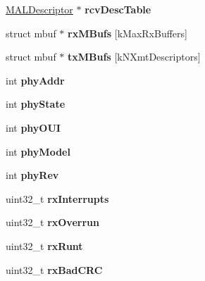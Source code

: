 \begin{DoxyCompactItemize}
\mbox{\hyperlink{structMALDescriptor}{M\+A\+L\+Descriptor}} $\ast$ {\bfseries rcv\+Desc\+Table}
\item 
\mbox{\label{structEMACLocals_aba69f1a5ef847157fe91777cfa6d0a63}} 
struct mbuf $\ast$ {\bfseries rx\+M\+Bufs} \mbox{[}k\+Max\+Rx\+Buffers\mbox{]}
\item 
\mbox{\label{structEMACLocals_ae11648c932962a4596bf27fa2c4b0928}} 
struct mbuf $\ast$ {\bfseries tx\+M\+Bufs} \mbox{[}k\+N\+Xmt\+Descriptors\mbox{]}
\item 
\mbox{\label{structEMACLocals_a7125b7eee9430db40a02e7d895982021}} 
int {\bfseries phy\+Addr}
\item 
\mbox{\label{structEMACLocals_a6a5a949c48a1c868c47bb3842626757b}} 
int {\bfseries phy\+State}
\item 
\mbox{\label{structEMACLocals_a0a6d086ba57427331ea03fe54b687aaf}} 
int {\bfseries phy\+O\+UI}
\item 
\mbox{\label{structEMACLocals_a6333a3d138e18708c560105c63230978}} 
int {\bfseries phy\+Model}
\item 
\mbox{\label{structEMACLocals_abd8e1286e3c7713ed893b43b0880a2ab}} 
int {\bfseries phy\+Rev}
\item 
\mbox{\label{structEMACLocals_ad6cb915809e2c7e882001a6669ef9e7a}} 
uint32\+\_\+t {\bfseries rx\+Interrupts}
\item 
\mbox{\label{structEMACLocals_a5c06faab014394b9959ee83af49f50de}} 
uint32\+\_\+t {\bfseries rx\+Overrun}
\item 
\mbox{\label{structEMACLocals_ab9140b6cf38b6686aa9d92f05f8dca81}} 
uint32\+\_\+t {\bfseries rx\+Runt}
\item 
\mbox{\label{structEMACLocals_af560dc059fc0d5b9fc8326ac3807c3e7}} 
uint32\+\_\+t {\bfseries rx\+Bad\+C\+RC}
\item 
\mbox{\label{structEMACLocals_a109ea8b861fabe08520b19d6340dc05b}} 

\end{DoxyCompactItemize}
